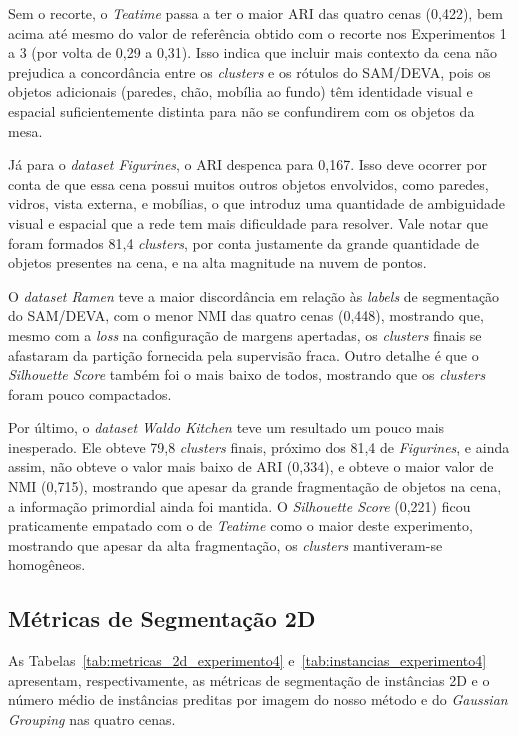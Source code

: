 Sem o recorte, o \textit{Teatime} passa a ter o maior ARI das quatro cenas (0,422), bem acima até mesmo do valor de referência obtido com o recorte nos Experimentos 1 a 3 (por volta de 0,29 a 0,31). Isso indica que incluir mais contexto da cena não prejudica a concordância entre os \textit{clusters} e os rótulos do SAM/DEVA, pois os objetos adicionais (paredes, chão, mobília ao fundo) têm identidade visual e espacial suficientemente distinta para não se confundirem com os objetos da mesa. 

Já para o \textit{dataset Figurines}, o ARI despenca para 0,167. Isso deve ocorrer por conta de que essa cena possui muitos outros objetos envolvidos, como paredes, vidros, vista externa, e mobílias, o que introduz uma quantidade de ambiguidade visual e espacial que a rede tem mais dificuldade para resolver. Vale notar que foram formados 81,4 \textit{clusters}, por conta justamente da grande quantidade de objetos presentes na cena, e na alta magnitude na nuvem de pontos.

O \textit{dataset Ramen} teve a maior discordância em relação às \textit{labels} de segmentação do SAM/DEVA, com o menor NMI das quatro cenas (0,448), mostrando que, mesmo com a \textit{loss} na configuração de margens apertadas, os \textit{clusters} finais se afastaram da partição fornecida pela supervisão fraca. Outro detalhe é que o \textit{Silhouette Score} também foi o mais baixo de todos, mostrando que os \textit{clusters} foram pouco compactados.

Por último, o \textit{dataset Waldo Kitchen} teve um resultado um pouco mais inesperado. Ele obteve 79,8 \textit{clusters} finais, próximo dos 81,4 de \textit{Figurines}, e ainda assim, não obteve o valor mais baixo de ARI (0,334), e obteve o maior valor de NMI (0,715), mostrando que apesar da grande fragmentação de objetos na cena, a informação primordial ainda foi mantida. O \textit{Silhouette Score} (0,221) ficou praticamente empatado com o de \textit{Teatime} como o maior deste experimento, mostrando que apesar da alta fragmentação, os \textit{clusters} mantiveram-se homogêneos.

\subsection{Métricas de Segmentação 2D}

As Tabelas~\ref{tab:metricas_2d_experimento4} e~\ref{tab:instancias_experimento4} apresentam, respectivamente, as métricas de segmentação de instâncias 2D e o número médio de instâncias preditas por imagem do nosso método e do \textit{Gaussian Grouping} nas quatro cenas.


